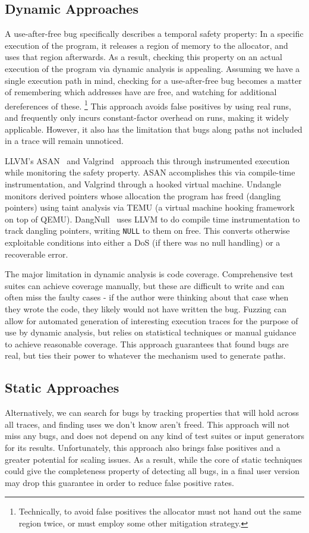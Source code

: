 \subsection{Dynamic Approaches}
A use-after-free bug specifically describes a temporal safety property:
In a specific execution of the program, it releases a region of memory to the allocator, and uses that region afterwards.
As a result, checking this property on an actual execution of the program via dynamic analysis is appealing.
Assuming we have a single execution path in mind, checking for a use-after-free bug becomes a matter of remembering which addresses have are free, and watching for additional dereferences of these.
\footnote{Technically, to avoid false positives the allocator must not hand out the same region twice, or must employ some other mitigation strategy.}
This approach avoids false positives by using real runs, and frequently only incurs constant-factor overhead on runs, making it widely applicable.
However, it also has the limitation that bugs along paths not included in a trace will remain unnoticed.

LLVM's ASAN~\cite{asan} and Valgrind~\cite{valgrind} approach this through instrumented execution while monitoring the safety property.
ASAN accomplishes this via compile-time instrumentation, and Valgrind through a hooked virtual machine.
Undangle~\cite{undangle} monitors derived pointers whose allocation the program has freed (dangling pointers) using taint analysis via TEMU (a virtual machine hooking framework on top of QEMU).
DangNull~\cite{dangnull} uses LLVM to do compile time instrumentation to track dangling pointers, writing \texttt{NULL} to them on free.
This converts otherwise exploitable conditions into either a DoS (if there was no null handling) or a recoverable error.

The major limitation in dynamic analysis is code coverage.
Comprehensive test suites can achieve coverage manually, but these are difficult to write and can often miss the faulty cases - if the author were thinking about that case when they wrote the code, they likely would not have written the bug.
Fuzzing can allow for automated generation of interesting execution traces for the purpose of use by dynamic analysis, but relies on statistical techniques or manual guidance to achieve reasonable coverage.
This approach guarantees that found bugs are real, but ties their power to whatever the mechanism used to generate paths.

\subsection{Static Approaches}
Alternatively, we can search for bugs by tracking properties that will hold across all traces, and finding uses we don't know aren't freed.
This approach will not miss any bugs, and does not depend on any kind of test suites or input generators for its results.
Unfortunately, this approach also brings false positives and a greater potential for scaling issues.
As a result, while the core of static techniques could give the completeness property of detecting all bugs, in a final user version may drop this guarantee in order to reduce false positive rates.

